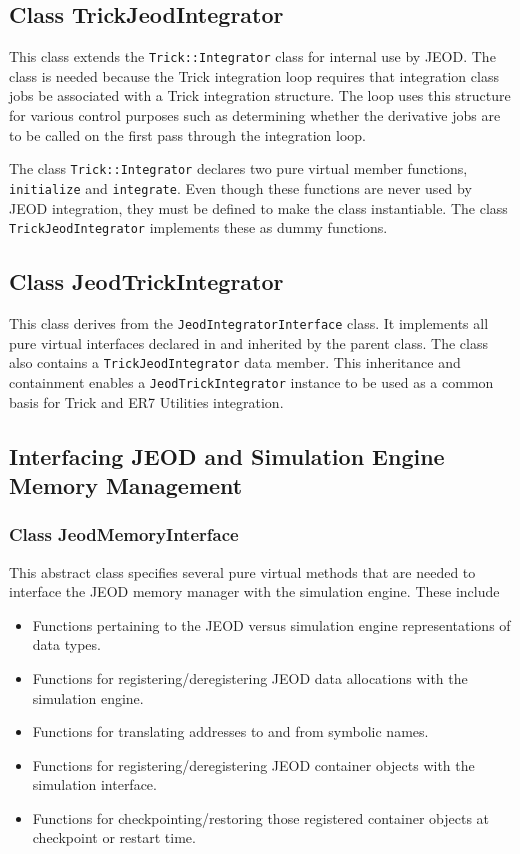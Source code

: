 \subsection{Class TrickJeodIntegrator}
This class extends the \verb|Trick::Integrator| class for internal use by
JEOD. The class is needed because the Trick integration loop requires that
integration class jobs be associated with a Trick integration structure.
The loop uses this structure for various control purposes such as
determining whether the derivative jobs are to be called on the first
pass through the integration loop.

The class \verb|Trick::Integrator| declares two pure virtual member
functions, \verb|initialize| and \verb|integrate|.
Even though these functions are never used by JEOD integration, they
must be defined to make the class instantiable.
The class \verb|TrickJeodIntegrator| implements these as dummy functions.

\subsection{Class JeodTrickIntegrator}
This class derives from the \verb|JeodIntegratorInterface| class.
It implements all pure virtual interfaces declared in and inherited by
the parent class.
The class also contains a \verb|TrickJeodIntegrator| data member.
This inheritance and containment enables a \verb|JeodTrickIntegrator| instance
to be used as a common basis for Trick and ER7 Utilities integration.

\subsection{Interfacing JEOD and Simulation Engine Memory Management}
\subsubsection{Class JeodMemoryInterface}
This abstract class specifies several pure virtual methods that are needed to
interface the JEOD memory manager with the simulation engine. These include
\begin{itemize}
\item Functions pertaining to the JEOD versus simulation engine
representations of data types.
\item Functions for registering/deregistering JEOD data allocations
with the simulation engine.
\item Functions for translating addresses to and from symbolic names.
\item Functions for registering/deregistering JEOD container objects
with the simulation interface.
\item Functions for checkpointing/restoring those registered  container objects
at checkpoint or restart time.
\end{itemize}

